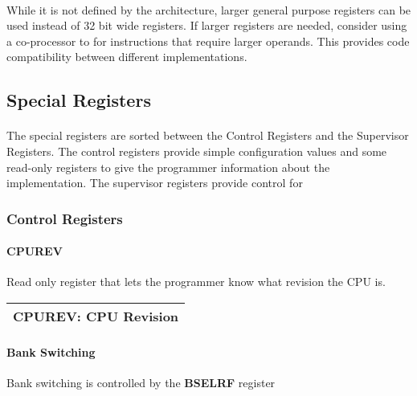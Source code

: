\documentclass[letterpaper, 11pt]{article}
\begin{document}
\paragraph{}While it is not defined by the architecture, larger general purpose registers can be used instead of 32 bit wide registers. 
If larger registers are needed, consider using a co-processor to for instructions that require larger operands. 
This provides code compatibility between different implementations.
\subsection{Special Registers}
\paragraph{}The special registers are sorted between the Control Registers and the Supervisor Registers. The control registers provide
simple configuration values and some read-only registers to give the programmer information about the implementation. The supervisor
registers provide control for 
\subsubsection{Control Registers}
\paragraph{CPUREV} Read only register that lets the programmer know what revision the CPU is. \\
\begin{center}
	\begin{tabular}{|c|c|c|c|c|c|}
		\hline
			\multicolumn{6}{|c|}{CPUREV: CPU Revision} \\
		\hline
		\hline
		
	\end{tabular}
\end{center}


\paragraph{Bank Switching} Bank switching is controlled by the \textbf{BSELRF} register\\
\begin{center}
		\begin{tabular}{|c|c|c|c|c|}
		\hline
		\hline
		\hline
		
	\end{tabular}
\end{center}	
\end{document}
